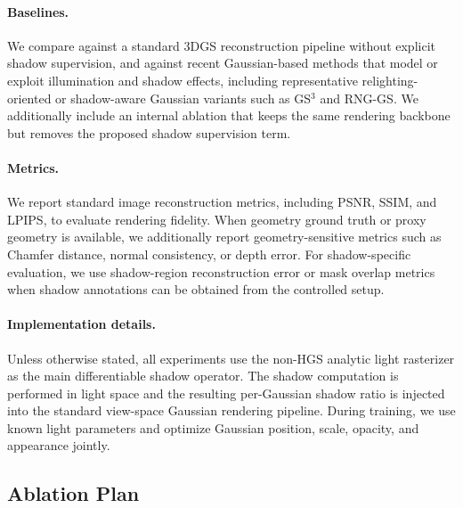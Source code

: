 \paragraph{Baselines.}
We compare against a standard 3DGS reconstruction pipeline without explicit shadow supervision, and against recent Gaussian-based methods that model or exploit illumination and shadow effects, including representative relighting-oriented or shadow-aware Gaussian variants such as GS$^3$ and RNG-GS. We additionally include an internal ablation that keeps the same rendering backbone but removes the proposed shadow supervision term.

\paragraph{Metrics.}
We report standard image reconstruction metrics, including PSNR, SSIM, and LPIPS, to evaluate rendering fidelity. When geometry ground truth or proxy geometry is available, we additionally report geometry-sensitive metrics such as Chamfer distance, normal consistency, or depth error. For shadow-specific evaluation, we use shadow-region reconstruction error or mask overlap metrics when shadow annotations can be obtained from the controlled setup.

\paragraph{Implementation details.}
Unless otherwise stated, all experiments use the non-HGS analytic light rasterizer as the main differentiable shadow operator. The shadow computation is performed in light space and the resulting per-Gaussian shadow ratio is injected into the standard view-space Gaussian rendering pipeline. During training, we use known light parameters and optimize Gaussian position, scale, opacity, and appearance jointly.

\subsection{Ablation Plan}
\label{sec:ablation}

